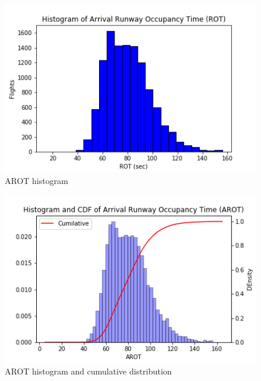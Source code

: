 

\begin{figure}
    \centering
    \includegraphics[width=1\textwidth]{graphics/AROT_hist.png}
    \caption[AROT histogram]{AROT histogram}
    \label{fig:AROT_hist}
\end{figure}

\begin{figure}
    \centering
    \includegraphics[width=1\textwidth]{graphics/AROT_hist_cumul.png}
    \caption[AROT histogram and cumulative distribution]{AROT histogram and cumulative distribution}
    \label{fig:AROT_hist_cumul}
\end{figure}

